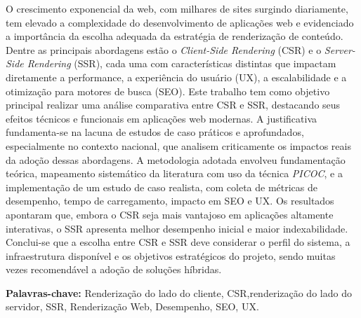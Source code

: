\begin{resumo}



O crescimento exponencial da web, com milhares de sites surgindo diariamente, tem elevado a complexidade do desenvolvimento de aplicações web e evidenciado a importância da escolha adequada da estratégia de renderização de conteúdo. Dentre as principais abordagens estão o \textit{Client-Side Rendering} (CSR) e o \textit{Server-Side Rendering} (SSR), cada uma com características distintas que impactam diretamente a performance, a experiência do usuário (UX), a escalabilidade e a otimização para motores de busca (SEO). Este trabalho tem como objetivo principal realizar uma análise comparativa entre CSR e SSR, destacando seus efeitos técnicos e funcionais em aplicações web modernas. A justificativa fundamenta-se na lacuna de estudos de caso práticos e aprofundados, especialmente no contexto nacional, que analisem criticamente os impactos reais da adoção dessas abordagens. A metodologia adotada envolveu fundamentação teórica, mapeamento sistemático da literatura com uso da técnica \textit{PICOC}, e a implementação de um estudo de caso realista, com coleta de métricas de desempenho, tempo de carregamento, impacto em SEO e UX. Os resultados apontaram que, embora o CSR seja mais vantajoso em aplicações altamente interativas, o SSR apresenta melhor desempenho inicial e maior indexabilidade. Conclui-se que a escolha entre CSR e SSR deve considerar o perfil do sistema, a infraestrutura disponível e os objetivos estratégicos do projeto, sendo muitas vezes recomendável a adoção de soluções híbridas.

\textbf{Palavras-chave: } Renderização do lado do cliente, CSR,renderização do lado do servidor, SSR,  Renderização Web, Desempenho, SEO, UX.

\end{resumo}


